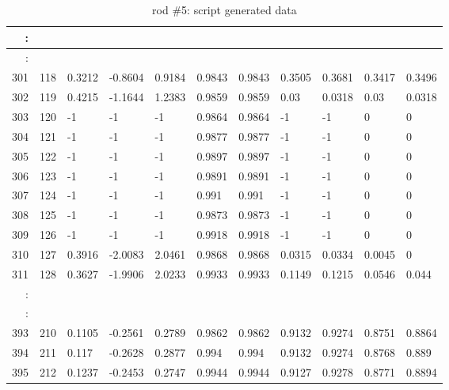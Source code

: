 \begin{table}[p]
{\begin{minipage}{\textheight}
\begin{tabular}{rr|lll|ll|llll}
 :      &     			&        			&        			&       					&       	&       		&       	&       		&       			&       			\\
 \hline
 :      &     			&        			&        			&       					&       	&       		&       	&       		&       			&       			\\
 301    & 118 			& 0.3212 			& -0.8604			& 0.9184					& 0.9843	& 0.9843		& 0.3505	& 0.3681		& 0.3417			& 0.3496			\\
 302    & 119 			& 0.4215 			& -1.1644			& 1.2383					& 0.9859	& 0.9859		& 0.03  	& 0.0318		& 0.03  			& 0.0318			\\
 303    & 120 			& -1     			& -1     			& -1    					& 0.9864	& 0.9864		& -1    	& -1    		& 0     			& 0     			\\
 304    & 121 			& -1     			& -1     			& -1    					& 0.9877	& 0.9877		& -1    	& -1    		& 0     			& 0     			\\
 305    & 122 			& -1     			& -1     			& -1    					& 0.9897	& 0.9897		& -1    	& -1    		& 0     			& 0     			\\
 306    & 123 			& -1     			& -1     			& -1    					& 0.9891	& 0.9891		& -1    	& -1    		& 0     			& 0     			\\
 307    & 124 			& -1     			& -1     			& -1    					& 0.991 	& 0.991 		& -1    	& -1    		& 0     			& 0     			\\
 308    & 125 			& -1     			& -1     			& -1    					& 0.9873	& 0.9873		& -1    	& -1    		& 0     			& 0     			\\
 309    & 126 			& -1     			& -1     			& -1    					& 0.9918	& 0.9918		& -1    	& -1    		& 0     			& 0     			\\
 310    & 127 			& 0.3916 			& -2.0083			& 2.0461					& 0.9868	& 0.9868		& 0.0315	& 0.0334		& 0.0045			& 0     			\\
 311    & 128 			& 0.3627 			& -1.9906			& 2.0233					& 0.9933	& 0.9933		& 0.1149	& 0.1215		& 0.0546			& 0.044 			\\
 :      &     			&        			&        			&       					&       	&       		&       	&       		&       			&       			\\
 \hline
 :      &     			&        			&        			&       					&       	&       		&       	&       		&       			&       			\\
 393    & 210 			& 0.1105 			& -0.2561			& 0.2789					& 0.9862	& 0.9862		& 0.9132	& 0.9274		& 0.8751			& 0.8864			\\
 394    & 211 			& 0.117  			& -0.2628			& 0.2877					& 0.994 	& 0.994 		& 0.9132	& 0.9274		& 0.8768			& 0.889 			\\
 395    & 212 			& 0.1237 			& -0.2453			& 0.2747					& 0.9944	& 0.9944		& 0.9127	& 0.9278		& 0.8771			& 0.8894			 
 \end{tabular}
        \caption{rod \#5: script generated data}
        \label{tab:spit-out-5}
      \end{minipage}
    }
  \end{table}
 


